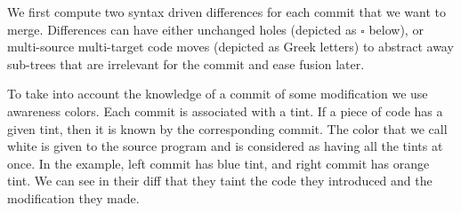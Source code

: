 \documentclass[a4paper,10pt]{article}
\begin{document}
We first compute two syntax driven differences for each commit that we want to merge. Differences can have either unchanged holes (depicted as $\square$ below), or multi-source multi-target code moves (depicted as Greek letters) to abstract away sub-trees that are irrelevant for the commit and ease fusion later.

To take into account the knowledge of a commit of some modification we use awareness colors. Each commit is associated with a tint. If a piece of code has a given tint, then it is known by the corresponding commit. The color that we call white is given to the source program and is considered as having all the tints at once. In the example, left commit has blue tint, and right commit has orange tint. We can see in their diff that they taint the code they introduced and the modification they made.
\end{document}
